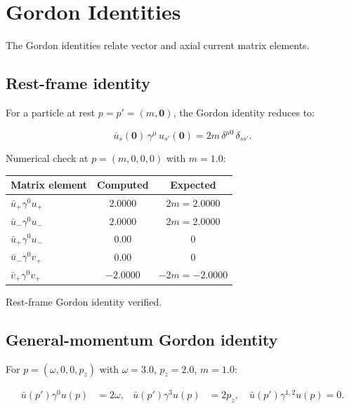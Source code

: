 \documentclass[12pt]{article}
\newcommand{\verified}[1]{\textcolor{verifygreen}{\checkmark\; #1}}
\begin{document}
\section{Gordon Identities}

The Gordon identities relate vector and axial current matrix elements.

\subsection{Rest-frame identity}

For a particle at rest $p=p'=(m,\mathbf{0})$, the Gordon identity reduces to:
\begin{mdframed}[backgroundcolor=blue!5]
\begin{equation}
\bar u_s(\mathbf{0})\,\gamma^\mu\,u_{s'}(\mathbf{0})
 = 2m\,\delta^{\mu 0}\,\delta_{ss'} .
\tag{38.20}
\end{equation}
\end{mdframed}

Numerical check at $p=(m,0,0,0)$ with $m=1.0$:
\begin{center}
\begin{tabular}{l|c|c}
Matrix element & Computed & Expected \\ \hline
$\bar u_+\gamma^0 u_+$ & $2.0000$ & $2m=2.0000$ \\
$\bar u_-\gamma^0 u_-$ & $2.0000$ & $2m=2.0000$ \\
$\bar u_+\gamma^0 u_-$ & $0.00$ & $0$ \\
$\bar u_-\gamma^0 v_+$ & $0.00$ & $0$ \\
$\bar v_+\gamma^0 v_+$ & $-2.0000$ & $-2m=-2.0000$ \\
\end{tabular}
\end{center}
\verified{Rest-frame Gordon identity verified.}

\subsection{General-momentum Gordon identity}

For $p=(\omega,0,0,p_z)$ with $\omega=3.0$, $p_z=2.0$, $m=1.0$:

\begin{mdframed}[backgroundcolor=blue!5]
\begin{align}
\bar u(p')\gamma^0 u(p) &= 2\omega , &
\bar u(p')\gamma^3 u(p) &= 2p_z , \quad
\bar u(p')\gamma^{1,2} u(p) = 0 .
\end{align}
\end{mdframed}
\end{document}
